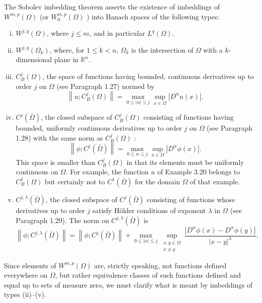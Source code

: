 \begin{para}
  The Sobolev imbedding theorem asserts the existence of imbeddings of $W^{m, p}(\Omega)$
  (or $W_0^{m, p}(\Omega)$ ) into Banach spaces of the following types:
  \begin{enumerate}[(i)]
    \item $W^{j,q}(\Omega)$, where $j \leq m$, and in particular $L^q(\Omega)$.
    \item $W^{j,q}\left(\Omega_k\right)$, where, for $1 \leq k<n$,
      $\Omega_k$ is the intersection of $\Omega$ with a
      $k$-dimensional plane in $\mathbb{R}^n$.
    \item $C_B^j(\Omega)$, the space of functions having bounded, continuous derivatives up to order $j$ on $\Omega$ (see Paragraph 1.27) normed by
    \[
    \left\|u ; C_B^j(\Omega)\right\|=\max _{0 \leq|\alpha| \leq j} \sup _{x \in \Omega}\left|D^\alpha u(x)\right| .
    \]
    \item $C^j(\bar{\Omega})$, the closed subspace of $C_B^j(\Omega)$ consisting of functions 
      having bounded, uniformly continuous derivatives up to order $j$ on $\Omega$
      (see Paragraph 1.28) with the same norm as $C_B^j(\Omega)$ :
      \[
        \left\|\phi ; C^j(\bar{\Omega})\right\|=\max _{0 \leq \alpha \leq j} \sup _{x \in \Omega}\left|D^\alpha \phi(x)\right| .
      \]
      This space is smaller than $C_B^j(\Omega)$ in that its elements must be uniformly continuous 
      on $\Omega$. For example, the function $u$ of Example 3.20 belongs to $C_B^1(\Omega)$ but 
      certainly not to $C^1(\bar{\Omega})$ for the domain $\Omega$ of that example.
    \item $C^{j, \lambda}(\bar{\Omega})$, the closed subspace of $C^j(\bar{\Omega})$ consisting of 
      functions whose derivatives up to order $j$ satisfy Hölder conditions of exponent $\lambda$ 
      in $\Omega$ (see Paragraph 1.29). The norm on $C^{j, \lambda}(\bar{\Omega})$ is
      \[
        \left\|\phi ; C^{j, \lambda}(\bar{\Omega})\right\|=\left\|\phi ; C^j(\bar{\Omega})\right\|+\max _{0 \leq|\alpha| \leq j} \sup _{\substack{x, y \in \Omega \\ x \neq y}} \frac{\left|D^\alpha \phi(x)-D^\alpha \phi(y)\right|}{|x-y|^\lambda} .
      \]
  \end{enumerate}
  Since elements of $W^{m, p}(\Omega)$ are, strictly speaking, not functions defined everywhere on 
  $\Omega$, but rather equivalence classes of such functions defined and equal up to sets of 
  measure zero, we must clarify what is meant by imbeddings of types (ii)--(v).

\end{para}

